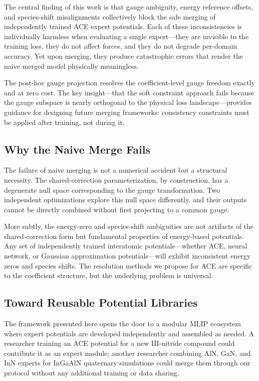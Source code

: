 \documentclass[twoside,prb,aps,floatfix,superscriptaddress,longbibliography]{revtex4-2}
\begin{document}
The central finding of this work is that gauge ambiguity, energy reference offsets, and species-shift misalignments collectively block the safe merging of independently trained ACE expert potentials. Each of these inconsistencies is individually harmless when evaluating a single expert---they are invisible to the training loss, they do not affect forces, and they do not degrade per-domain accuracy. Yet upon merging, they produce catastrophic errors that render the naive merged model physically meaningless.

The post-hoc gauge projection resolves the coefficient-level gauge freedom exactly and at zero cost. The key insight---that the soft constraint approach fails because the gauge subspace is nearly orthogonal to the physical loss landscape---provides guidance for designing future merging frameworks: consistency constraints must be applied after training, not during it.

\subsection{Why the Naive Merge Fails}

The failure of naive merging is not a numerical accident but a structural necessity. The shared-correction parameterization, by construction, has a degenerate null space corresponding to the gauge transformation. Two independent optimizations explore this null space differently, and their outputs cannot be directly combined without first projecting to a common gauge.

More subtly, the energy-zero and species-shift ambiguities are not artifacts of the shared-correction form but fundamental properties of energy-based potentials. Any set of independently trained interatomic potentials---whether ACE, neural network, or Gaussian approximation potentials---will exhibit inconsistent energy zeros and species shifts. The resolution methods we propose for ACE are specific to the coefficient structure, but the underlying problem is universal.

\subsection{Toward Reusable Potential Libraries}

The framework presented here opens the door to a modular MLIP ecosystem where expert potentials are developed independently and assembled as needed. A researcher training an ACE potential for a new III-nitride compound could contribute it as an expert module; another researcher combining AlN, GaN, and InN experts for InGaAlN quaternary simulations could merge them through our protocol without any additional training or data sharing.
\end{document}
